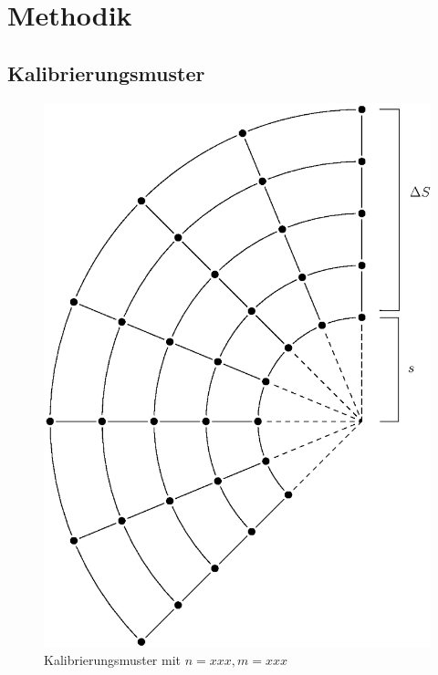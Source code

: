 \chapter{Methodik}
\label{ch:method}


\section{Kalibrierungsmuster}
\label{s:calibrationPattern}

\begin{figure}[!htb]
	\centering
	\includegraphics[scale=.6]{images/calibrationPattern2.eps}
	\caption{Kalibrierungsmuster mit $n = xxx, m = xxx$}
	\label{fig:calibrationPattern}
\end{figure}
